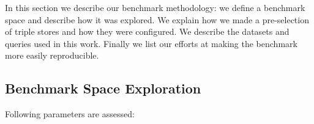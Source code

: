 
In this section we describe our benchmark methodology: we define a benchmark space and describe how it was explored. We explain how we made a pre-selection of triple stores
and how they were configured. We describe the datasets and queries used in this work. Finally we list our efforts at making the benchmark more easily reproducible.


\subsection{Benchmark Space Exploration}
\label{subsec:bmexplore}

Following parameters are assessed:

